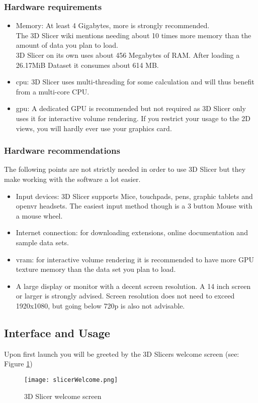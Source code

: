 \subsubsection{Hardware requirements}
\begin{itemize}
	\item Memory: At least 4 Gigabytes, more is strongly recommended.\\The 3D Slicer wiki mentions needing about 10 times more memory than the amount of data you plan to load.\\ 3D Slicer on its own uses about 456 Megabytes of RAM. After loading a 26.17MiB Dataset it consumes about 614 MB.
	\item \gls{cpu}: 3D Slicer uses multi-threading for some calculation and will thus benefit from a multi-core CPU.
	\item \gls{gpu}: A dedicated GPU is recommended but not required as 3D Slicer only uses it for interactive volume rendering. If you restrict your usage to the 2D views, you will hardly ever use your graphics card.
\end{itemize}

\subsubsection{Hardware recommendations}
The following points are not strictly needed in order to use 3D Slicer but they make working with the software a lot easier.
\begin{itemize}
	\item Input devices: 3D Slicer supports Mice, touchpads, pens, graphic tablets and \gls{openvr} headsets. The easiest input method though is a 3 button Mouse with a mouse wheel.
	\item Internet connection: for downloading extensions, online documentation and sample data sets.
	\item \gls{vram}: for interactive volume rendering it is recommended to have more GPU texture memory than the data set you plan to load.
	\item A large display or monitor with a decent screen resolution. A 14 inch screen or larger is strongly advised. Screen resolution does not need to exceed 1920x1080, but going below 720p is also not advisable.
\end{itemize}


\subsection{Interface and Usage}
Upon first launch you will be greeted by the 3D Slicers welcome screen (see: Figure \ref{fig:slicerWelcome})
\begin{figure}[h!] %
	\centerline{
		\texttt{[image: slicerWelcome.png]}}
	\caption{3D Slicer welcome screen}
	\label{fig:slicerWelcome}
\end{figure}

